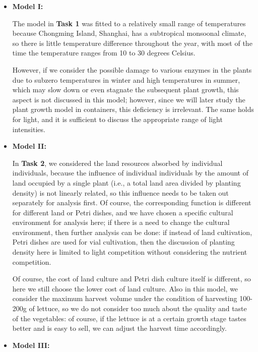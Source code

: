 \begin{itemize}
    \item \textbf{Model I:}
    
    The model in \textbf{Task 1} was fitted to a relatively small range of temperatures because Chongming Island, Shanghai, has a subtropical monsoonal climate, so there is little temperature difference throughout the year, with most of the time the temperature ranges from 10 to 30 degrees Celsius.

    However, if we consider the possible damage to various enzymes in the plants due to subzero temperatures in winter and high temperatures in summer, which may slow down or even stagnate the subsequent plant growth, this aspect is not discussed in this model; however, since we will later study the plant growth model in containers, this deficiency is irrelevant. The same holds for light, and it is sufficient to discuss the appropriate range of light intensities. 
    
    \item \textbf{Model II:}
    
    In \textbf{Task 2}, we considered the land resources absorbed by individual individuals, because the influence of individual individuals by the amount of land occupied by a single plant (i.e., a total land area divided by planting density) is not linearly related, so this influence needs to be taken out separately for analysis first. Of course, the corresponding function is different for different land or Petri dishes, and we have chosen a specific cultural environment for analysis here; if there is a need to change the cultural environment, then further analysis can be done: if instead of land cultivation, Petri dishes are used for vial cultivation, then the discussion of planting density here is limited to light competition without considering the nutrient competition. 

    Of course, the cost of land culture and Petri dish culture itself is different, so here we still choose the lower cost of land culture. Also in this model, we consider the maximum harvest volume under the condition of harvesting 100-200g of lettuce, so we do not consider too much about the quality and taste of the vegetables: of course, if the lettuce is at a certain growth stage tastes better and is easy to sell, we can adjust the harvest time accordingly.
    
    \item \textbf{Model III:}
    

\end{itemize}
